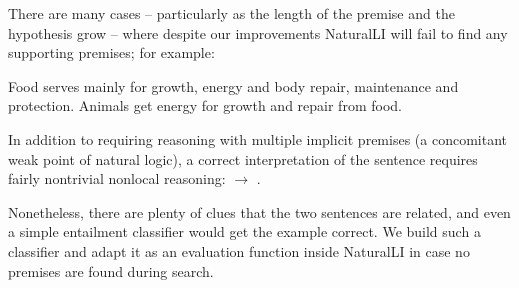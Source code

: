 There are many cases -- particularly as the length of the premise and the hypothesis grow --
  where despite our improvements NaturalLI will fail to find any supporting
  premises; for example:

\entailmentExample
{Food serves mainly for growth, energy and body repair, maintenance and protection.}
{Animals get energy for growth and repair from food.}

In addition to requiring reasoning with multiple implicit premises (a concomitant weak
  point of natural logic), a correct interpretation of the sentence requires
  fairly nontrivial nonlocal reasoning: 
  $\rightarrow$ .

Nonetheless, there are plenty of clues that the two sentences are related, and even a simple
  entailment classifier would get the example correct.
We build such a classifier and adapt it as an evaluation function
  inside NaturalLI in case no premises are found during search.



